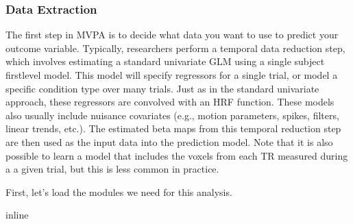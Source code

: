 \documentclass[letterpaper,10pt,english]{sphinxmanual}
\begin{document}
\noindent{}

\begin{sphinxVerbatim}[commandchars=\\\{\}]
\end{sphinxVerbatim}

\noindent{}


\subsubsection{Data Extraction}
\label{\detokenize{content/Multivariate_Prediction:data-extraction}}
The first step in MVPA is to decide what data you want to use to predict your outcome variable. Typically, researchers perform a temporal data reduction step, which involves estimating a standard univariate GLM using a single subject first\sphinxhyphen{}level model. This model will specify regressors for a single trial, or model a specific condition type over many trials. Just as in the standard univariate approach, these regressors are convolved with an HRF function. These models also usually include nuisance covariates (e.g., motion parameters, spikes, filters, linear trends, etc.). The estimated beta maps from this temporal reduction step are then used as the input data into the prediction model. Note that it is also possible to learn a  model that includes the voxels from each TR measured during a a given trial, but this is less common in practice.

First, let’s load the modules we need for this analysis.

\begin{sphinxVerbatim}[commandchars=\\\{\}]
 inline

 
 
   
   
   
   
   
   
    
   

  
   
\end{sphinxVerbatim}
\end{document}
